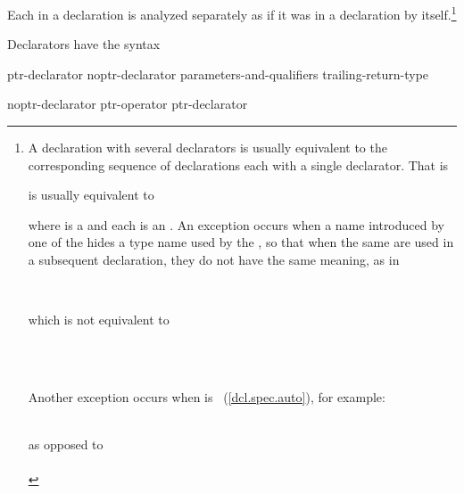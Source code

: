 \pnum
Each
in a declaration is analyzed separately as if it was in a declaration by
itself.\footnote{A declaration with several declarators is usually equivalent
to the corresponding sequence of declarations each with a single declarator.
That is


\noindent is usually equivalent to


\noindent where
is a
and each
is an
.
An exception occurs when a name introduced by one of the
hides a type name used by the
,
so that when the same
are used in a subsequent declaration, they do not have the same meaning,
as in

\\
\indent{}

\noindent which is not equivalent to

\\
\indent{}\\
\indent{}

\noindent Another exception occurs when  is ~(\ref{dcl.spec.auto}),
for example:

\\
\noindent as opposed to\\
\indent{}\\
\indent{}
}

\pnum
Declarators have the syntax

\begin{bnf}
\br
    ptr-declarator\br
    noptr-declarator parameters-and-qualifiers trailing-return-type
\end{bnf}

\begin{bnf}
\br
    noptr-declarator\br
    ptr-operator ptr-declarator
\end{bnf}

